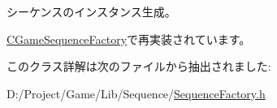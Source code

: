 シーケンスのインスタンス生成。 



\hyperlink{class_c_game_sequence_factory_a868862261fd54f2d6f05a7fd0ba41b34}{C\+Game\+Sequence\+Factory}で再実装されています。



このクラス詳解は次のファイルから抽出されました\+:\begin{DoxyCompactItemize}
\item 
D\+:/\+Project/\+Game/\+Lib/\+Sequence/\hyperlink{_sequence_factory_8h}{Sequence\+Factory.\+h}\end{DoxyCompactItemize}
